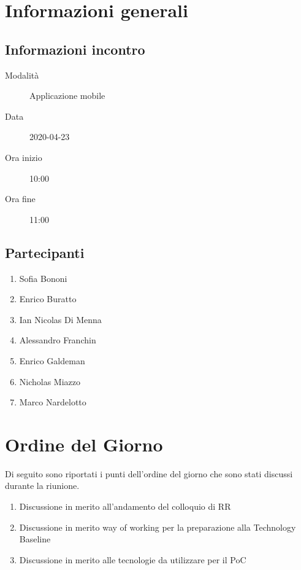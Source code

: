 \documentclass{article}
\begin{document}


\section{Informazioni generali}%
\label{sec:informazioni_generali}

\subsection{Informazioni incontro}%
\label{sub:informazioni_incontro}

\begin{description}
  \item[Modalità] Applicazione mobile 
  \item[Data] 2020-04-23
  \item[Ora inizio] 10:00
  \item[Ora fine] 11:00
\end{description}

\subsection{Partecipanti}%
\label{sub:partecipanti}

\begin{enumerate}
  \item Sofia Bononi
  \item Enrico Buratto
  \item Ian Nicolas Di Menna
  \item Alessandro Franchin
  \item Enrico Galdeman
  \item Nicholas Miazzo
  \item Marco Nardelotto
\end{enumerate}

\section{Ordine del Giorno}%
\label{ordine_del_giorno}
Di seguito sono riportati i punti dell'ordine del giorno che sono stati discussi durante la riunione.
\begin{enumerate}
  \item Discussione in merito all'andamento del colloquio di RR
  \item Discussione in merito way of working per la preparazione alla Technology Baseline
  \item Discussione in merito alle tecnologie da utilizzare per il PoC
\end{enumerate}
\end{document}
